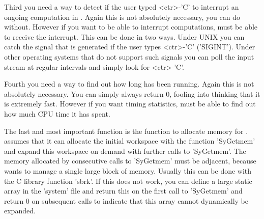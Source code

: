 Third you need a  way to detect if the  user typed <ctr>-'C' to interrupt
an   ongoing  computation   in  {\GAP}.  Again    this is not  absolutely
necessary,  you can   do without.   However  if you want  to   be able to
interrupt computations,  {\GAP} must be able to  receive  the  interrupt.
This can be done in two ways.  Under  UNIX you can  catch the signal that
is   generated  if   the  user types <ctr>-'C'  ('SIGINT').   Under other
operating systems that do not support such signals you can poll the input
stream at regular intervals and simply look for <ctr>-'C'.

Fourth you  need  a way  to  find out how long  {\GAP} has  been running.
Again this is not  absolutely necessary.  You can simply always return 0,
fooling  {\GAP} into  thinking that it is extremely fast.  However if you
want timing statistics, {\GAP} must be able to find out how much CPU time
it has spent.

The  last and most important function  is the function to allocate memory
for {\GAP}.  {\GAP}  assumes that  it can allocate the initial  workspace
with the function  'SyGetmem' and expand this workspace  on  demand  with
further calls to 'SyGetmem'.  The  memory allocated by consecutive calls
to 'SyGetmem' must be  adjacent, because {\GAP}  wants to manage a single
large  block  of memory.  Usually this   can be done  with  the C library
function 'sbrk'.  If this does  not work, you  can define a  large static
array in  the  'system'  file and return  this  on    the  first call  to
'SyGetmem' and return 0  on subsequent calls  to indicate that this array
cannot dynamically be expanded.
